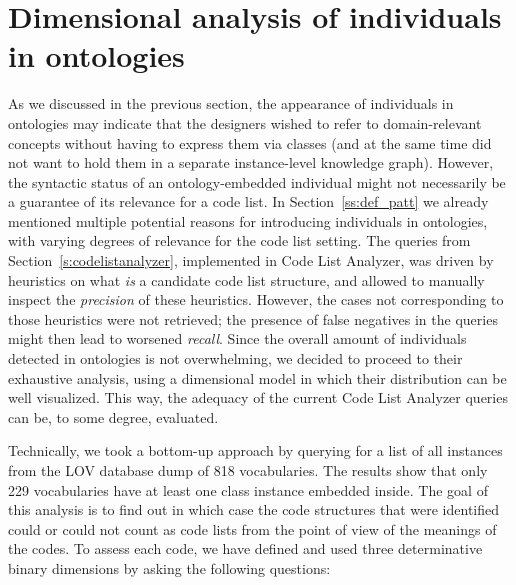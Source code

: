 





\section{Dimensional analysis of individuals in ontologies}
\label{s:analysis_code_list_modeling_practice}

As we discussed in the previous section, the appearance of individuals in ontologies may indicate that the designers wished to refer to domain-relevant concepts without having to express them via classes (and at the same time did not want to hold them in a separate instance-level knowledge graph).
However, the syntactic status of an ontology-embedded individual might not necessarily be a guarantee of its relevance for a code list. 
In Section~\ref{ss:def_patt} we already mentioned multiple potential reasons for introducing individuals in ontologies, with varying degrees of relevance for the code list setting.
The queries from Section~\ref{s:codelistanalyzer}, implemented in Code List Analyzer, was driven by heuristics on what \emph{is} a candidate code list structure, and allowed to manually inspect the \emph{precision} of these heuristics.
However, the cases not corresponding to those heuristics were not retrieved; the presence of false negatives in the queries might then lead to worsened \emph{recall}. 
Since the overall amount of individuals detected in ontologies is not overwhelming, we decided to proceed to their exhaustive analysis, using a dimensional model in which their distribution can be well visualized.
This way, the adequacy of the current Code List Analyzer queries can be, to some degree, evaluated. 

Technically, we took a bottom-up approach by querying for a list of all instances from the LOV database dump of 818 vocabularies. The results show that only 229 
vocabularies have at least one class instance embedded inside. The goal of this analysis is to find out in which case the code structures that were identified could or could not count as code lists from the point of view of the meanings of the codes. To assess each code, we have defined and used three determinative binary dimensions by asking the following questions: %


